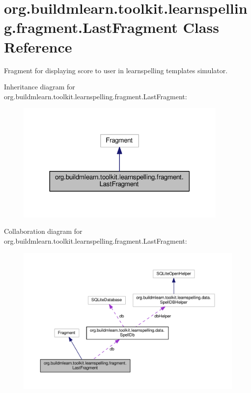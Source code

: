 \hypertarget{classorg_1_1buildmlearn_1_1toolkit_1_1learnspelling_1_1fragment_1_1LastFragment}{}\section{org.\+buildmlearn.\+toolkit.\+learnspelling.\+fragment.\+Last\+Fragment Class Reference}
\label{classorg_1_1buildmlearn_1_1toolkit_1_1learnspelling_1_1fragment_1_1LastFragment}


Fragment for displaying score to user in learnspelling template\textquotesingle{}s simulator.  




Inheritance diagram for org.\+buildmlearn.\+toolkit.\+learnspelling.\+fragment.\+Last\+Fragment\+:
\nopagebreak
\begin{figure}[H]
\begin{center}
\leavevmode
\includegraphics[width=293pt]{classorg_1_1buildmlearn_1_1toolkit_1_1learnspelling_1_1fragment_1_1LastFragment__inherit__graph}
\end{center}
\end{figure}


Collaboration diagram for org.\+buildmlearn.\+toolkit.\+learnspelling.\+fragment.\+Last\+Fragment\+:
\nopagebreak
\begin{figure}[H]
\begin{center}
\leavevmode
\includegraphics[width=350pt]{classorg_1_1buildmlearn_1_1toolkit_1_1learnspelling_1_1fragment_1_1LastFragment__coll__graph}
\end{center}
\end{figure}
